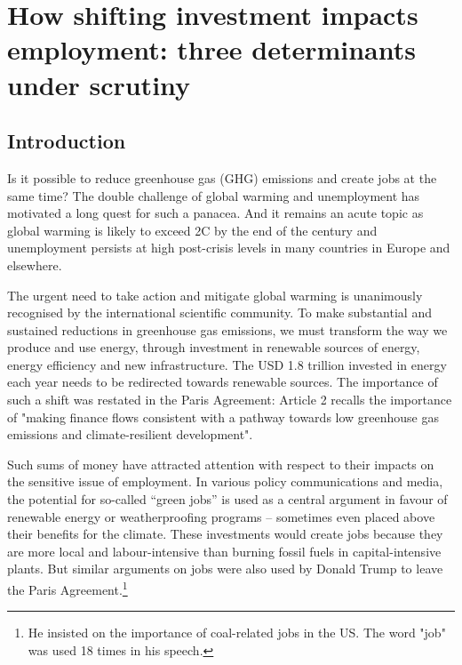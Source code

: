 \chapter{How shifting investment impacts employment: three determinants under scrutiny} \label{chap:mechanisms}

\section{Introduction} \label{Introduction}

Is it possible to reduce greenhouse gas (GHG) emissions and create jobs at the same time? The double challenge of global warming and unemployment has motivated a long quest for such a panacea. And it remains an acute topic as global warming is likely to exceed 2\degree C by the end of the century and unemployment persists at high post-crisis levels in many countries in Europe and elsewhere.

The urgent need to take action and mitigate global warming is unanimously recognised by the international scientific community. To make substantial and sustained reductions in greenhouse gas emissions, we must transform the way we produce and use energy, through investment in renewable sources of energy, energy efficiency and new infrastructure. The USD 1.8 trillion invested in energy each year \citep{IEAWIR2016} needs to be redirected towards renewable sources. The importance of such a shift was restated in the Paris Agreement: Article 2 recalls the importance of "making finance flows consistent with a pathway towards low greenhouse gas emissions and climate-resilient development". 

Such sums of money have attracted attention with respect to their impacts on the sensitive issue of employment. In various policy communications and media, the potential for so-called “green jobs” is used as a central argument in favour of renewable energy or weatherproofing programs – sometimes even placed above their benefits for the climate. These investments would create jobs because they are more local and labour-intensive than burning fossil fuels in capital-intensive plants. But similar arguments on jobs were also used by Donald Trump to leave the Paris Agreement.\footnote{He insisted on the importance of coal-related jobs in the US. The word "job" was used 18 times in his speech.}

